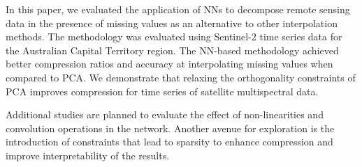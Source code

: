 \documentclass[essd, manuscript]{copernicus}
\begin{document}



\conclusions  %
In this paper, we evaluated the application of NNs to decompose remote sensing data in the presence of missing values as an alternative to other interpolation methods. The methodology was evaluated using Sentinel-2 time series data for the Australian Capital Territory region. The NN-based methodology achieved better compression ratios and accuracy at interpolating missing values when compared to PCA. We demonstrate that relaxing the orthogonality constraints of PCA improves compression for time series of satellite multispectral data.

Additional studies are planned to evaluate the effect of non-linearities and convolution operations in the network. Another avenue for exploration is the introduction of constraints that lead to sparsity to enhance compression and improve interpretability of the results. 
\end{document}
